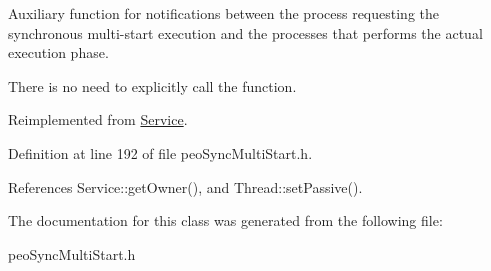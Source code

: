 Auxiliary function for notifications between the process requesting the synchronous multi-start execution and the processes that performs the actual execution phase. 

There is no need to explicitly call the function. 

Reimplemented from \hyperlink{classService_f94cc8a5c2665d4574041737e61e9ffc}{Service}.

Definition at line 192 of file peo\-Sync\-Multi\-Start.h.

References Service::get\-Owner(), and Thread::set\-Passive().

The documentation for this class was generated from the following file:\begin{CompactItemize}
\item 
peo\-Sync\-Multi\-Start.h\end{CompactItemize}
